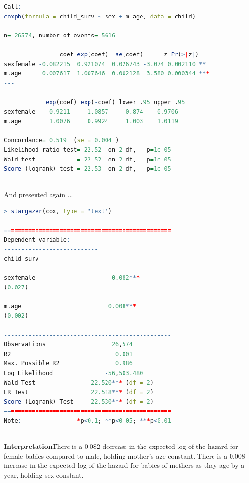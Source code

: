 \documentclass[12pt,letterpaper]{article}
\begin{document}
\begin{lstlisting}[language=R]
Call:
coxph(formula = child_surv ~ sex + m.age, data = child)

n= 26574, number of events= 5616 

				coef exp(coef)  se(coef)      z Pr(>|z|)    
sexfemale -0.082215  0.921074  0.026743 -3.074 0.002110 ** 
m.age      0.007617  1.007646  0.002128  3.580 0.000344 ***
---

			exp(coef) exp(-coef) lower .95 upper .95
sexfemale    0.9211     1.0857     0.874    0.9706
m.age        1.0076     0.9924     1.003    1.0119

Concordance= 0.519  (se = 0.004 )
Likelihood ratio test= 22.52  on 2 df,   p=1e-05
Wald test            = 22.52  on 2 df,   p=1e-05
Score (logrank) test = 22.53  on 2 df,   p=1e-05



\end{lstlisting}

\noindent And presented again ...

\begin{lstlisting}[language=R]
> stargazer(cox, type = "text")

================================================
Dependent variable:    
---------------------------
child_surv         
------------------------------------------------
sexfemale                     -0.082***         
(0.027)          

m.age                         0.008***          
(0.002)          

------------------------------------------------
Observations                   26,574           
R2                              0.001           
Max. Possible R2                0.986           
Log Likelihood               -56,503.480        
Wald Test                22.520*** (df = 2)     
LR Test                  22.518*** (df = 2)     
Score (Logrank) Test     22.530*** (df = 2)     
================================================
Note:                *p<0.1; **p<0.05; ***p<0.01
	
\end{lstlisting}

\noindent \textbf{Interpretation}There is a 0.082 decrease in the expected log of the hazard for female babies compared to 
male, holding mother's age constant. There is a 0.008 increase in the expected log of the hazard for babies of mothers as they age by a year, holding sex constant.\\
\end{document}
